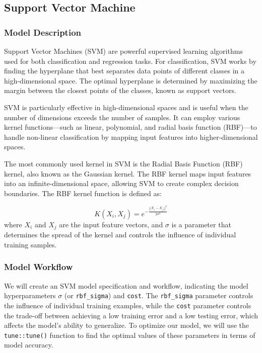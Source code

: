 \documentclass[
  letterpaper,
  DIV=11,
  numbers=noendperiod]{scrartcl}
\begin{document}
\subsection{Support Vector Machine}\label{support-vector-machine}

\subsubsection{Model Description}\label{model-description-1}

Support Vector Machines (SVM) are powerful supervised learning
algorithms used for both classification and regression tasks. For
classification, SVM works by finding the hyperplane that best separates
data points of different classes in a high-dimensional space. The
optimal hyperplane is determined by maximizing the margin between the
closest points of the classes, known as support vectors.

SVM is particularly effective in high-dimensional spaces and is useful
when the number of dimensions exceeds the number of samples. It can
employ various kernel functions---such as linear, polynomial, and radial
basis function (RBF)---to handle non-linear classification by mapping
input features into higher-dimensional spaces.

The most commonly used kernel in SVM is the Radial Basis Function (RBF)
kernel, also known as the Gaussian kernel. The RBF kernel maps input
features into an infinite-dimensional space, allowing SVM to create
complex decision boundaries. The RBF kernel function is defined as:

\[K(X_i, X_j) = e^{- \frac{|| X_i - X_j ||^2}{2 \sigma^2}}\] where
\(X_i\) and \(X_j\) are the input feature vectors, and \(\sigma\) is a
parameter that determines the spread of the kernel and controls the
influence of individual training samples.

\subsubsection{Model Workflow}\label{model-workflow-1}

We will create an SVM model specification and workflow, indicating the
model hyperparameters \(\sigma\) (or \texttt{rbf\_sigma}) and
\texttt{cost}. The \texttt{rbf\_sigma} parameter controls the influence
of individual training examples, while the \texttt{cost} parameter
controls the trade-off between achieving a low training error and a low
testing error, which affects the model's ability to generalize. To
optimize our model, we will use the \texttt{tune::tune()} function to
find the optimal values of these parameters in terms of model accuracy.
\end{document}
